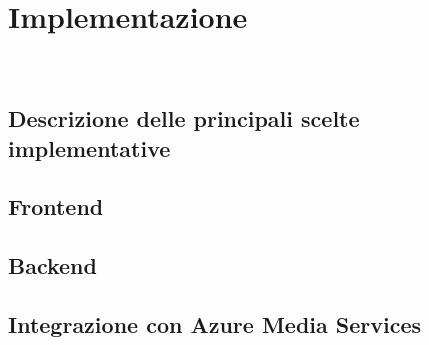 \chapter{Implementazione}
\label{cap:implementazione}
\\

\section{Descrizione delle principali scelte implementative}

\section{Frontend}

\section{Backend}

\section{Integrazione con Azure Media Services}